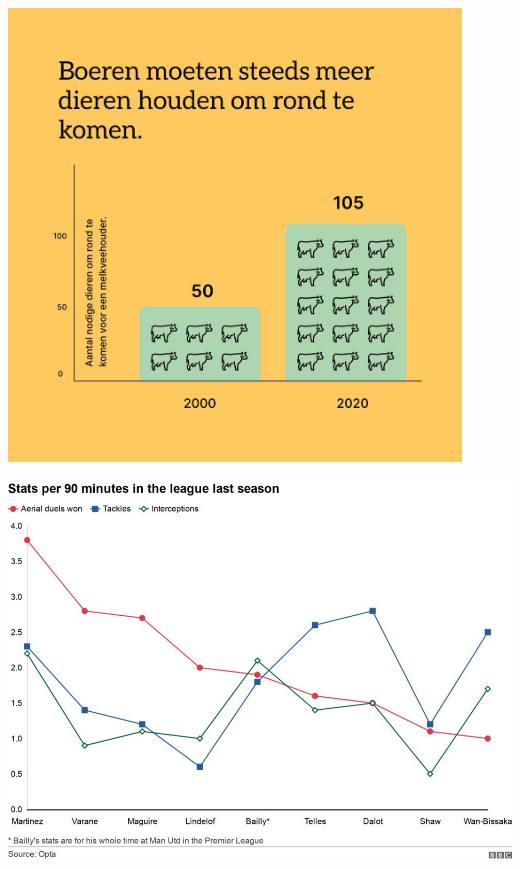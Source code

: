 \documentclass{beamer}
\begin{document}
 \begin{frame}\centering\includegraphics[width=0.9\textwidth,keepaspectratio]{graphcrimes/FVdSWe5XsAAYJGH.jpeg}\end{frame}
 \begin{frame}\centering\includegraphics[width=\textwidth,keepaspectratio]{graphcrimes/FX7LWekXEAIr0lP.jpeg}\end{frame}
\end{document}
